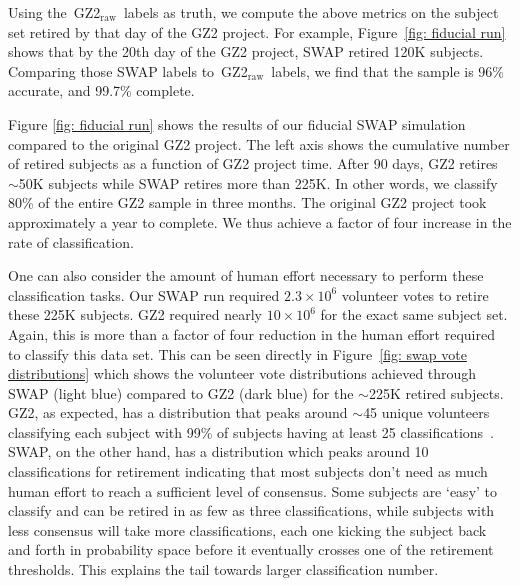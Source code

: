 \documentclass[twocolumn]{aastex6}
\newcommand{\feat}{`Featured'}
\newcommand{\raw}{GZ2$_{\text{raw}}$}
\begin{document}
Using the~\raw~labels as truth, we compute the above metrics on the 
subject set retired by that day of the GZ2 project.
For example, Figure~\ref{fig: fiducial run} shows that by the 20th day of the GZ2 project, 
SWAP retired 120K subjects. Comparing those SWAP labels to~\raw~labels, 
we find that the sample is 96\% accurate, and 99.7\% complete. 

Figure \ref{fig: fiducial run} shows the results of our fiducial SWAP simulation
compared to the original GZ2 project. The left axis shows the cumulative
number of retired subjects as a function of GZ2 project time. After 90 days, GZ2 
retires $\sim$50K subjects while SWAP retires more than 225K. In other words, 
we classify 80\% of the entire GZ2 sample in three months. 
The original GZ2 project took approximately a year to complete. 
We thus achieve a factor of four increase in the rate of classification. 

One can also consider the amount of human effort necessary to 
perform these classification tasks. Our SWAP run required $2.3 \times 10^6$ volunteer
votes to retire these 225K subjects. GZ2 required nearly $10 \times 10^6$ for the 
exact same subject set. Again, this is more than a factor of four reduction in 
the human effort required to classify this data set.  This can be seen directly in 
Figure~\ref{fig: swap vote distributions} which shows the volunteer 
vote distributions achieved through SWAP (light blue) compared to GZ2 (dark blue)
for the $\sim$225K retired subjects. GZ2, as expected, has a distribution that peaks 
around $\sim$45 unique volunteers classifying each subject with 99\% of subjects 
having at least 25 classifications~\citep{Willett2013}. 
SWAP, on the other hand, has a distribution which peaks around 10 classifications
for retirement indicating that most subjects don't need as much human effort
to reach a sufficient level of consensus. Some subjects are `easy' to classify and can be 
retired in as few as three classifications, while subjects with less consensus will 
take more classifications, each one kicking the subject back and forth in probability space
before it eventually crosses one of the retirement thresholds. 
This explains the tail towards larger classification number.
\end{document}
